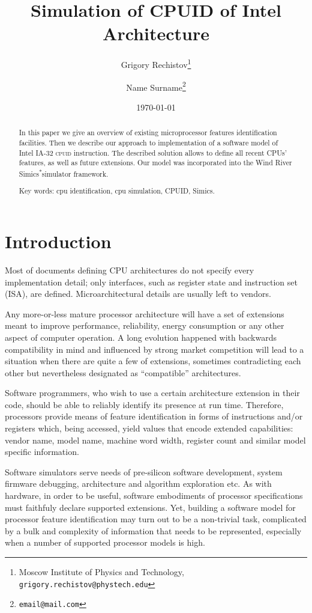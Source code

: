 \documentclass[a4paper,10pt,oneside,unicode]{article}
\author{Grigory Rechistov\thanks{Moscow Institute of Physics and Technology, \texttt{grigory.rechistov@phystech.edu}} \and Name Surname\thanks{\texttt{email@mail.com}}}
\title{Simulation of CPUID of Intel Architecture}
\date{\today}
\newcommand{\cpuid}{\textsc{cpuid} }
\newcommand{\othercopyright}{\textsuperscript{*}}
\begin{document}
\maketitle

\tableofcontents

\begin{abstract}
    
   \noindent In this paper we give an overview of existing microprocessor features identification facilities. Then we describe our approach to implementation of a software model of Intel IA-32 \cpuid instruction. The described solution allows to define all recent {CPUs}' features, as well as future extensions. Our model was incorporated into the Wind River Simics\othercopyright simulator framework.
    
    \noindent Key words: cpu identification, cpu simulation, CPUID, Simics.
\end{abstract}

\section {Introduction}

Most of documents defining CPU architectures do not specify every implementation detail; only interfaces, such as register state and instruction set (ISA), are defined. Microarchitectural details are usually left to vendors.

Any more-or-less mature processor architecture will have a set of extensions meant to improve performance, reliability, energy consumption or any other aspect of computer operation. A long evolution happened with backwards compatibility in mind and influenced by strong market competition will lead to a situation when there are quite a few of extensions, sometimes contradicting each other but nevertheless designated as “compatible” architectures.

Software programmers, who wish to use a certain architecture extension in their code, should be able to reliably identify its presence at run time. Therefore, processors provide means of feature identification in forms of instructions and/or registers which, being accessed, yield values that encode extended capabilities: vendor name, model name, machine word width, register count and similar model specific information.

Software simulators serve needs of pre-silicon software development, system firmware debugging, architecture and algorithm exploration etc. As with hardware, in order to be useful, software embodiments of processor specifications must faithfuly declare supported extensions. Yet, building a software model for processor feature identification may turn out to be a non-trivial task, complicated by a bulk and complexity of information that needs to be represented, especially when a number of supported processor models is high. 
\end{document}
